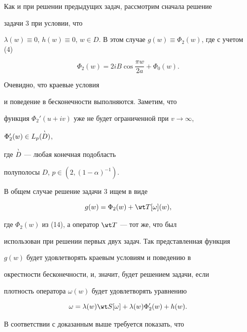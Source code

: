 \begin{pf}


Как и при решении предыдущих задач, рассмотрим сначала решение


задачи 3 при условии, что


$\lambda(w) \equiv 0$, $h(w) \equiv 0$, $w \in D$. В этом случае $g(w)


\equiv \Phi_2(w)$, где с учетом (4)


\begin{equation}


\Phi_2(w) = 2iB \cos \frac{\pi w}{2a} + \Phi_0(w).


\end{equation}


Очевидно, что краевые условия


и поведение в бесконечности выполняются. Заметим, что


функция $\Phi_2'(u + iv)$ уже не будет ограниченной при $v \to \infty$,


$\Phi_2'(w) \in L_p(\overset{\scriptscriptstyle\backprime}{D}{})$,


где $\overset{\scriptscriptstyle\backprime}{D}{}$ --- любая конечная подобласть


полуполосы $D$, $p \in (2, (1 - \alpha)^{-1})$.





В общем случае решение задачи 3 ищем в виде


\begin{equation}


g(w) = \Phi_2(w) + \wt T [\omega](w),


\end{equation}


где $\Phi_2(w)$ из (14), а оператор $\wt T$ --- тот же, что был


использован при решении первых двух задач. Так представленная функция


$g(w)$ будет удовлетворять краевым условиям и поведению в


окрестности бесконечности, и, значит, будет решением задачи, если


плотность оператора $\omega(w)$ будет удовлетворять уравнению


\begin{equation}


\omega = \lambda(w) \wt S[\omega] + \lambda(w) \Phi_2'(w) + h(w).


\end{equation}


В соответствии с доказанным выше требуется показать, что



\end{pf}
